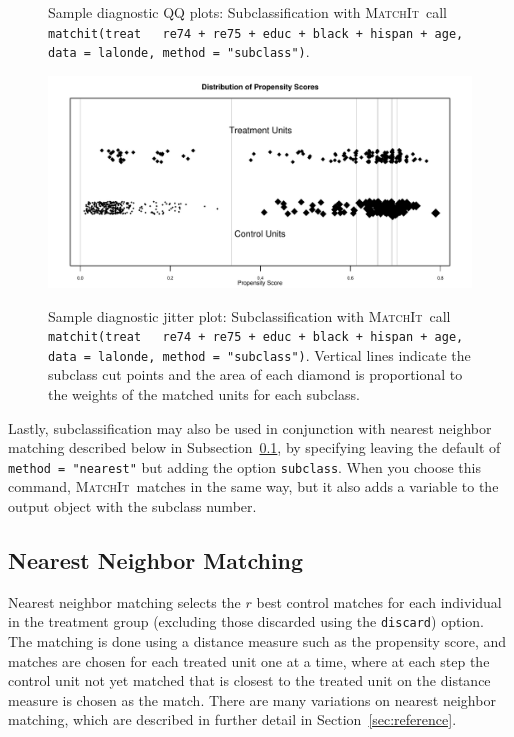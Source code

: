 \documentclass[oneside,letterpaper,titlepage]{article}
\newcommand{\MatchIt}{\textsc{MatchIt}}
\begin{document}
\begin{figure}[tbp]
\begin{center}
    \hfill
    \caption{Sample diagnostic QQ plots: Subclassification with
      \MatchIt\ call \texttt{matchit(treat ~ re74 + re75 + educ +
        black + hispan + age, data = lalonde, method = "subclass")}.}
\label{diagqqsub}
\end{center}
\end{figure}

\begin{figure}[tbp]
  \begin{center}
    {\includegraphics[scale=0.7]{figs/jitterplotsub}}
    \hfill
    \caption{Sample diagnostic jitter plot: Subclassification with
      \MatchIt\ call \texttt{matchit(treat ~ re74 + re75 + educ +
        black + hispan + age, data = lalonde, method = "subclass")}.
      Vertical lines indicate the subclass cut points and the area of
      each diamond is proportional to the weights of the matched units
      for each subclass.}
\label{diagjittersub}
\end{center}
\end{figure}


Lastly, subclassification may also be used in conjunction with nearest
neighbor matching described below in Subsection~\ref{nearest}, by
specifying leaving the default of \texttt{method = "nearest"} but
adding the option \texttt{subclass}.  When you choose this command,
\MatchIt\ matches in the same way, but it also adds a variable to the
output object with the subclass number.

\subsection{Nearest Neighbor Matching}
\label{nearest}

Nearest neighbor matching selects the $r$ best control matches for
each individual in the treatment group (excluding those discarded
using the \texttt{discard}) option.  The matching is done using a
distance measure such as the propensity score, and matches are chosen
for each treated unit one at a time, where at each step the control
unit not yet matched that is closest to the treated unit on the
distance measure is chosen as the match.  There are many variations on
nearest neighbor matching, which are described in further detail in
Section~\ref{sec:reference}. 
\end{document}
